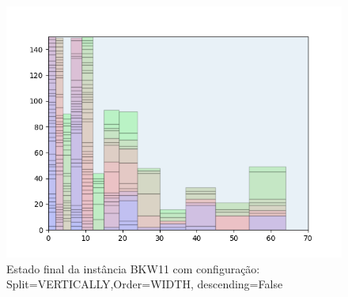 \begin{figure}[H]
    \centering
    \caption[]{Estado final da instância BKW11 com configuração: Split=VERTICALLY,Order=WIDTH, descending=False}
    \label{fig:bkw11-vertically-width-false}
    \includegraphics[scale=0.5]{output/figures/bkw/bkw11/vertically/width/false/000}
\end{figure}